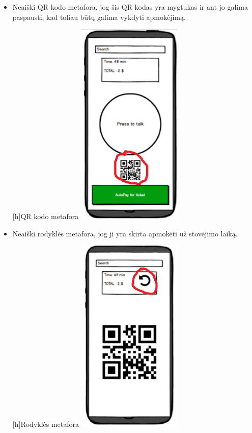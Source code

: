\documentclass{VUMIFPSkursinis}
\begin{document}
\vspace{5mm}
\begin{itemize}
\item Neaiški QR kodo metafora, jog šis QR kodas yra mygtukas ir ant jo galima paspausti, kad toliau būtų galima vykdyti apmokėjimą.\par
\begin{minipage}{\linewidth}
[h]{QR kodo metafora}
\centering
\includegraphics[width=5cm]{img/Bad1}
\end{minipage}
\item Neaiški rodyklės metafora, jog ji yra skirta apmokėti už stovėjimo laiką.\par
\begin{minipage}{\linewidth}
[h]{Rodyklės metafora}
\centering
\includegraphics[width=5cm]{img/Bad2}

\end{minipage}
\end{itemize}
\end{document}
